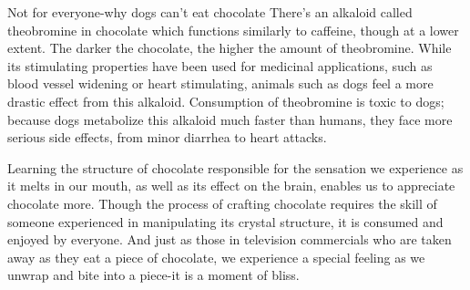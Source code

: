 \documentclass{book}\usepackage[]{graphicx}\usepackage[]{color}
\begin{document}
Not for everyone-why dogs can't eat chocolate 
There's an alkaloid called theobromine in chocolate which functions similarly to caffeine, though at a lower extent. The darker the chocolate, the higher the amount of theobromine. While its stimulating properties have been used for medicinal applications, such as blood vessel widening or heart stimulating, animals such as dogs feel a more drastic effect from this alkaloid. Consumption of theobromine is toxic to dogs; because dogs metabolize this alkaloid much faster than humans, they face more serious side effects, from minor diarrhea to heart attacks.

Learning the structure of chocolate responsible for the sensation we experience as it melts in our mouth, as well as its effect on the brain, enables us to appreciate chocolate more. Though the process of crafting chocolate requires the skill of someone experienced in manipulating its crystal structure, it is consumed and enjoyed by everyone. And just as those in television commercials who are taken away as they eat a piece of chocolate, we experience a special feeling as we unwrap and bite into a piece-it is a moment of bliss.

\printindex
\end{document}
